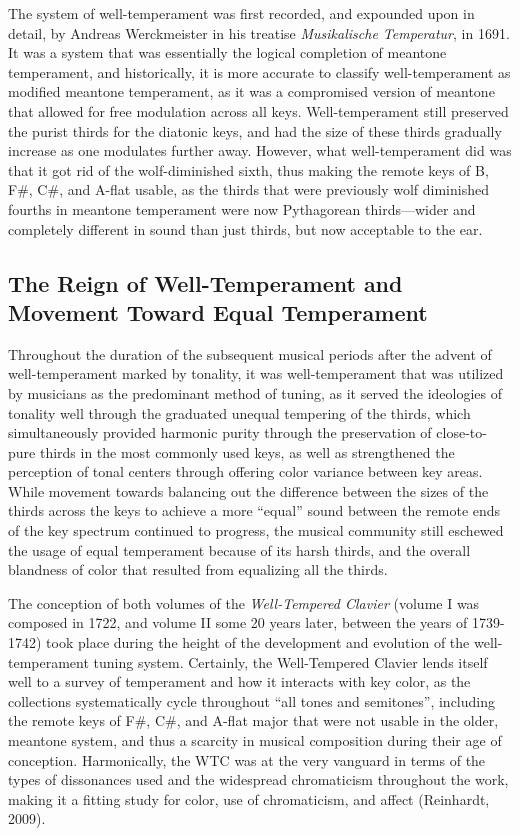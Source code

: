 The system of well-temperament was first recorded, and expounded upon in
detail, by Andreas Werckmeister in his treatise \emph{Musikalische
Temperatur}, in 1691. It was a system that was essentially the logical
completion of meantone temperament, and historically, it is more
accurate to classify well-temperament as modified meantone temperament,
as it was a compromised version of meantone that allowed for free
modulation across all keys. Well-temperament still preserved the purist
thirds for the diatonic keys, and had the size of these thirds gradually
increase as one modulates further away. However, what well-temperament
did was that it got rid of the wolf-diminished sixth, thus making the
remote keys of B, F\#, C\#, and A-flat usable, as the thirds that were
previously wolf diminished fourths in meantone temperament were now
Pythagorean thirds---wider and completely different in sound than just
thirds, but now acceptable to the ear.

\subsection{The Reign of Well-Temperament and Movement Toward Equal
Temperament}\label{the-reign-of-well-temperament-and-movement-toward-equal-temperament}

Throughout the duration of the subsequent musical periods after the
advent of well-temperament marked by tonality, it was well-temperament
that was utilized by musicians as the predominant method of tuning, as
it served the ideologies of tonality well through the graduated unequal
tempering of the thirds, which simultaneously provided harmonic purity
through the preservation of close-to-pure thirds in the most commonly
used keys, as well as strengthened the perception of tonal centers
through offering color variance between key areas. While movement
towards balancing out the difference between the sizes of the thirds
across the keys to achieve a more ``equal'' sound between the remote
ends of the key spectrum continued to progress, the musical community
still eschewed the usage of equal temperament because of its harsh
thirds, and the overall blandness of color that resulted from equalizing
all the thirds.

The conception of both volumes of the \emph{Well-Tempered Clavier}
(volume I was composed in 1722, and volume II some 20 years later,
between the years of 1739-1742) took place during the height of the
development and evolution of the well-temperament tuning system.
Certainly, the Well-Tempered Clavier lends itself well to a survey of
temperament and how it interacts with key color, as the collections
systematically cycle throughout ``all tones and semitones'', including
the remote keys of F\#, C\#, and A-flat major that were not usable in
the older, meantone system, and thus a scarcity in musical composition
during their age of conception. Harmonically, the WTC was at the very
vanguard in terms of the types of dissonances used and the widespread
chromaticism throughout the work, making it a fitting study for color,
use of chromaticism, and affect (Reinhardt, 2009).

